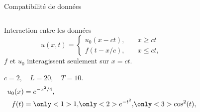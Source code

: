 \documentclass[aspectratio=169, french]{beamer}
\begin{document}
\begin{frame}{Compatibilité de données}

	\begin{columns}
		\begin{column}{.5\textwidth}
			\begin{overlayarea}{\textwidth}{\textheight}
			\begin{block}{Interaction entre les données}
				\begin{equation*}
					u(x, t) = 
					\begin{cases}
						u_0(x - ct), \quad &x\ge ct\\
						f(t-x/c), \quad &x\le ct,
					\end{cases}
				\end{equation*}
				$f$ et $u_0$ interagissent seulement sur $x=ct$.
			\end{block}
				\begin{tcolorbox}[title = Exemples, coltitle=white]
					$c=2, \quad L=20, \quad T = 10$.
					\begin{align*}
						u_0(x) &= e^{-x^2/4}, \\
						f(t) &= \only<1>{1,}  \only<2>{e^{-t^2},}  \only<3>{\cos^2(t),}
					\end{align*}
				\end{tcolorbox}	
			\end{overlayarea}
		\end{column}
		\begin{column}{.5\textwidth}
		\begin{overlayarea}{\textwidth}{\textheight}
			\begin{figure}
				\centering

\end{figure}
\end{overlayarea}
\end{column}
\end{columns}
\end{frame}
\end{document}
